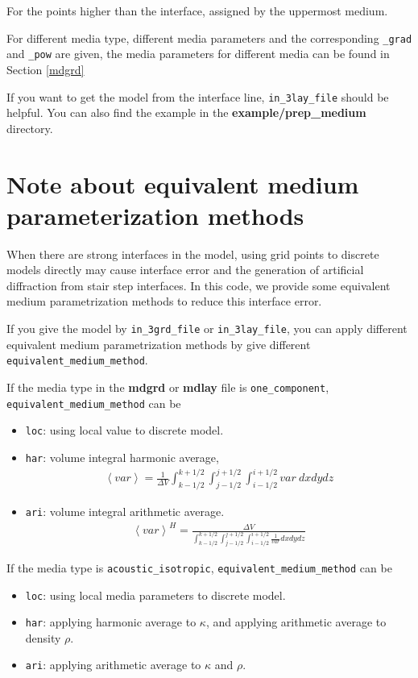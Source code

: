 For the points higher than the interface, assigned by the uppermost medium. 

For different media type, different media parameters and the corresponding \texttt{\_grad} and \texttt{\_pow} are given, the media parameters for different media can be found in Section \ref{mdgrd}

If you want to get the model from the interface line, \texttt{in\_3lay\_file} should be helpful.
You can also find the example in the \textbf{example/prep\_medium} directory.

\section{Note about equivalent medium parameterization methods} \label{equivalent_method} 
When there are strong interfaces in the model, using grid points to discrete models directly may cause interface error and the generation of artificial diffraction from stair step interfaces. In this code, we provide some equivalent medium parametrization methods to reduce this interface error.

If you give the model by \texttt{in\_3grd\_file} or \texttt{in\_3lay\_file}, you can apply different equivalent medium parametrization methods by give different \texttt{equivalent\_medium\_method}. 

If the media type in the \textbf{mdgrd} or \textbf{mdlay} file is \texttt{one\_component}, \texttt{equivalent\_medium\_method} can be
\begin{itemize}
 \item \texttt{loc}: using local value to discrete model. 
 \item \texttt{har}: volume integral harmonic average, 
  \begin{align}
    \left<var\right> = \frac{1}{\Delta V} \int_{k-1/2}^{k+1/2} \int_{j-1/2}^{j+1/2} \int_{i-1/2}^{i+1/2} var~dx dy dz 
  \end{align}
 \item \texttt{ari}: volume integral arithmetic average. 
  \begin{align}
    \left<var\right>^H = \frac{\Delta V}{\int_{k-1/2}^{k+1/2} \int_{j-1/2}^{j+1/2} \int_{i-1/2}^{i+1/2} \frac{1}{var} dx dy dz}
  \end{align}
\end{itemize}

If the media type is \texttt{acoustic\_isotropic}, \texttt{equivalent\_medium\_method} can be
\begin{itemize}
 \item \texttt{loc}: using local media parameters to discrete model. 
 \item \texttt{har}: applying harmonic average to $\kappa$, and applying arithmetic average to density $\rho$. 
 \item \texttt{ari}: applying arithmetic average to $\kappa$ and $\rho$. 
\end{itemize}


